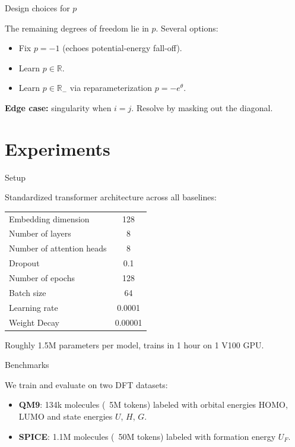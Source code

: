 \documentclass{beamer}
\begin{document}
\begin{frame}{Design choices for $p$}

The remaining degrees of freedom lie in $p$. Several options:
\begin{itemize}
    \item Fix $p = -1$ (echoes potential-energy fall-off).
    \item Learn $p \in \mathbb{R}$.
    \item Learn $p \in \mathbb{R}_-$ via reparameterization $p = -e^\theta$.
\end{itemize}

\vspace{1em}

\textbf{Edge case:} singularity when $i = j$. Resolve by masking out the diagonal.

\end{frame}

\section{Experiments}

\begin{frame}{Setup}

Standardized transformer architecture across all baselines:
\begin{table}
    \scriptsize
    \centering
    \begin{tabular}{lc}
    \toprule
    Embedding dimension & 128 \\
    Number of layers & 8 \\
    Number of attention heads & 8 \\
    Dropout & 0.1 \\
    Number of epochs & 128 \\
    Batch size & 64 \\
    Learning rate & 0.0001 \\
    Weight Decay & 0.00001 \\
    \bottomrule
    \end{tabular}
\end{table}

Roughly 1.5M parameters per model, trains in 1 hour on 1 V100 GPU.

\end{frame}

\begin{frame}{Benchmarks}

We train and evaluate on two DFT datasets:
\begin{itemize}
    \item \textbf{QM9}: 134k molecules (~5M tokens) labeled with orbital energies HOMO, LUMO and state energies $U$, $H$, $G$.
    \item \textbf{SPICE}: 1.1M molecules (~50M tokens) labeled with formation energy $U_F$.
\end{itemize}

\end{frame}
\end{document}
